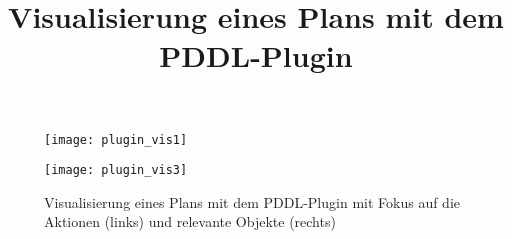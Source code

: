 \begin{figure}[ht!]
    \centering
    \begin{minipage}[t]{0.45\linewidth}
        \centering
        \texttt{[image: plugin\_vis1]}
    \end{minipage}%
    \hfill
    \begin{minipage}[t]{0.45\linewidth}
        \centering
        \texttt{[image: plugin\_vis3]}
    \end{minipage}
    \title{Visualisierung eines Plans mit dem PDDL-Plugin}
    \caption{Visualisierung eines Plans mit dem \acs{PDDL}-Plugin mit Fokus auf die Aktionen (links) und relevante Objekte (rechts)}
    \label{fig:pluginvis}
\end{figure}
